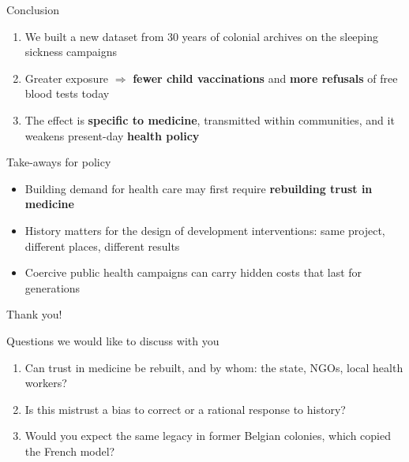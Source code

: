 \documentclass[aspectratio=1610]{beamer}
\newcommand{\highlight}[1]{\textcolor{accent}{\textbf{#1}}}
\begin{document}
\begin{frame}{Conclusion}
  \begin{enumerate}
    \item We built a new dataset from 30 years of colonial archives on the sleeping sickness campaigns
    \item Greater exposure $\Rightarrow$ \textbf{fewer child vaccinations} and \textbf{more refusals}
      of free blood tests today
    \item The effect is \textbf{specific to medicine}, transmitted within communities, and it weakens
      present-day \textbf{health policy}
  \end{enumerate}
  \vspace{0.6em}
  \begin{block}{Take-aways for policy}
    \begin{itemize}
      \item Building demand for health care may first require \highlight{rebuilding trust in medicine}
      \item History matters for the design of development interventions: same project, different
        places, different results
      \item Coercive public health campaigns can carry hidden costs that last for generations
    \end{itemize}
  \end{block}
\end{frame}

\begin{frame}
  \centering
  \vfill
  {\Huge\color{smileblue} Thank you!}\\[1.6em]
  \begin{minipage}{0.78\textwidth}
    \begin{block}{Questions we would like to discuss with you}
      \begin{enumerate}
        \item Can trust in medicine be rebuilt, and by whom: the state, NGOs, local health workers?
        \item Is this mistrust a bias to correct or a rational response to history?
        \item Would you expect the same legacy in former Belgian colonies, which copied the French model?
      \end{enumerate}
    \end{block}
  \end{minipage}
  \vfill
\end{frame}
\end{document}
